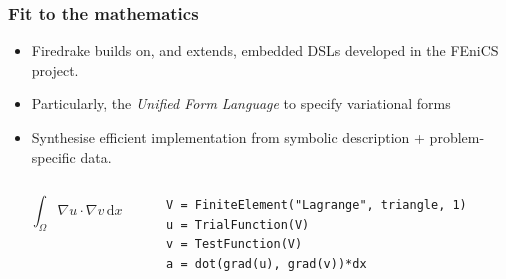 \documentclass[presentation]{beamer}
\begin{document}
\begin{frame}[fragile]
  \frametitle{Fit to the mathematics}
  \begin{itemize}
  \item Firedrake builds on, and extends, embedded DSLs developed in
    the FEniCS project.
  \item Particularly, the \emph{Unified Form Language} \parencite{Alnaes:2014} to
    specify variational forms
  \item Synthesise efficient implementation from symbolic description
    + problem-specific data.
  \end{itemize}
  \begin{columns}
    \begin{column}{0.4\textwidth}
      \begin{equation*}
        \int_\Omega \nabla u \cdot \nabla v\,\text{d}x
      \end{equation*}
    \end{column}
    \hspace{-3em}
    \begin{column}{0.6\textwidth}
\begin{verbatim}
V = FiniteElement("Lagrange", triangle, 1)
u = TrialFunction(V)
v = TestFunction(V)
a = dot(grad(u), grad(v))*dx
\end{verbatim}
    \end{column}
  \end{columns}
\end{frame}
\end{document}
